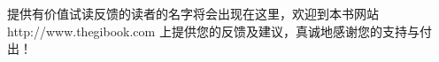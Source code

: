 %
%

\mtcaddchapter 
提供有价值试读反馈的读者的名字将会出现在这里，欢迎到本书网站http://www.thegibook.com 上提供您的反馈及建议，真诚地感谢您的支持与付出！
